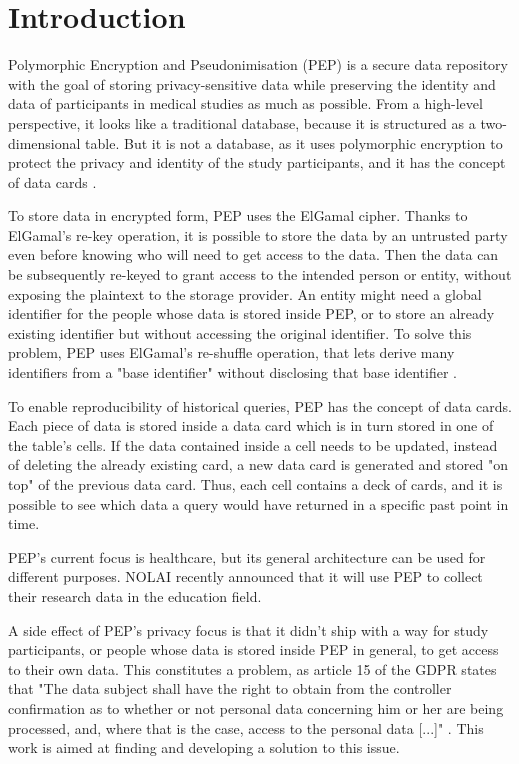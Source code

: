 \documentclass{report}
\begin{document}
\section{Introduction}
Polymorphic Encryption and Pseudonimisation (PEP) is a secure data repository with the goal of storing privacy-sensitive data while preserving the identity and data of participants
in medical studies as much as possible. From a high-level perspective, it looks like a traditional database, because it is structured as a two-dimensional table. But it is not a 
database, as it uses polymorphic encryption to protect the privacy and identity of the study participants, and it has the concept of data cards \cite{pep-blueprint}.\par
To store data in encrypted form, PEP uses the ElGamal cipher. Thanks to ElGamal's re-key operation, it is possible to store the data by an untrusted party even before knowing who
will need to get access to the data. Then the data can be subsequently re-keyed to grant access to the intended person or entity, without exposing the plaintext to the storage provider.
An entity might need a global identifier for the people whose data is stored inside PEP, or to store an already existing identifier but without accessing the original identifier. To
solve this problem, PEP uses ElGamal's re-shuffle operation, that lets derive many identifiers from a "base identifier" without disclosing that base identifier \cite{peppaper}.\par
To enable reproducibility of historical queries, PEP has the concept of data cards. Each piece of data is stored inside a data card which is in turn stored in one of the table's
cells. If the data contained inside a cell needs to be updated, instead of deleting the already existing card, a new data card is generated and stored "on top" of the previous data
card. Thus, each cell contains a deck of cards, and it is possible to see which data a query would have returned in a specific past point in time. \par
PEP's current focus is healthcare, but its general architecture can be used for different purposes. NOLAI \cite{nolai} \cite{pepproject} recently announced that it will use PEP to
collect their research data in the education field. \par
A side effect of PEP's privacy focus is that it didn't ship with a way for study participants, or people whose data is stored inside PEP in general, to get access to their own
data. This constitutes a problem, as article 15 of the GDPR states that "The data subject shall have the right to obtain from the controller confirmation as to whether or not
personal data concerning him or her are being processed, and, where that is the case, access to the personal data [...]" \cite{gdpr-art-15}. 
This work is aimed at finding and developing a solution to this issue.
\end{document}
